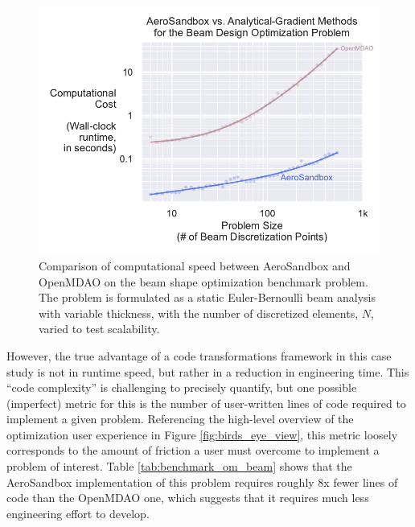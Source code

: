 \begin{figure}[h]
    \centering
    \includegraphics[width=\textwidth]{../figures/benchmark_om_beam.pdf}
    \caption{Comparison of computational speed between AeroSandbox and OpenMDAO on the beam shape optimization benchmark problem. The problem is formulated as a static Euler-Bernoulli beam analysis with variable thickness, with the number of discretized elements, $N$, varied to test scalability.}
    \label{fig:benchmark_om_beam}
\end{figure}

However, the true advantage of a code transformations framework in this case study is not in runtime speed, but rather in a reduction in engineering time. This ``code complexity'' is challenging to precisely quantify, but one possible (imperfect) metric for this is the number of user-written lines of code required to implement a given problem. Referencing the high-level overview of the optimization user experience in Figure \ref{fig:birds_eye_view}, this metric loosely corresponds to the amount of friction a user must overcome to implement a problem of interest. Table \ref{tab:benchmark_om_beam} shows that the AeroSandbox implementation of this problem requires roughly 8x fewer lines of code than the OpenMDAO one, which suggests that it requires much less engineering effort to develop.

